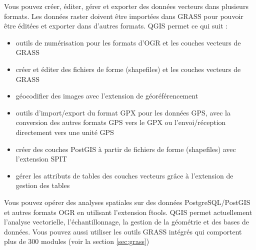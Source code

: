 

Vous pouvez créer, éditer, gérer et exporter des données vecteurs dans plusieurs formats. Les données raster doivent être importées dans GRASS pour pouvoir être éditées et exporter dans d'autres formats. QGIS permet ce qui suit :  

\begin{itemize}
\item outils de numérisation pour les formats d'OGR et les couches vecteurs de GRASS
\item créer et éditer des fichiers de forme (shapefiles) et les couches vecteurs de GRASS
\item géocodifier des images avec l'extension de géoréférencement
\item outils d'import/export du format GPX pour les données GPS, avec la conversion des autres formats GPS vers le GPX ou l'envoi/réception directement vers une unité GPS
\item créer des couches PostGIS à partir de fichiers de forme (shapefiles) avec l'extension SPIT
\item gérer les attributs de tables des couches vecteurs grâce à l'extension de gestion des tables
\end{itemize}


Vous pouvez opérer des analyses spatiales sur des données PostgreSQL/PostGIS et autres formats OGR en utilisant l'extension ftools. QGIS permet actuellement l'analyse vectorielle, l'échantillonnage, la gestion de la géométrie et des bases de données. Vous pouvez aussi utiliser les outils GRASS intégrés qui comportent plus de 300 modules (voir la section \ref{sec:grass})


